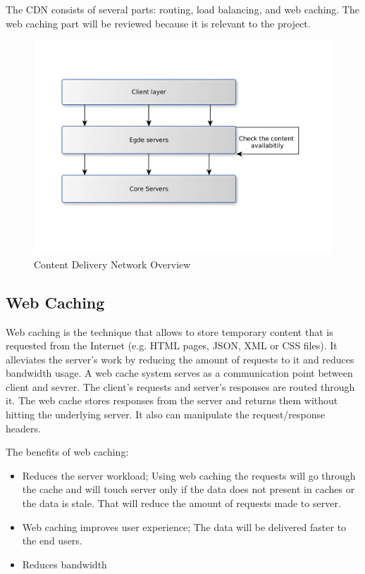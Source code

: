 The CDN consists of several parts: routing, load balancing, and web caching\cite{CDNOverview}. The web caching part will be reviewed because it is relevant to the project.

\begin{figure}[h]
    \centering
    \includegraphics[width=\textwidth]{images/cdn_arch.png}
    \caption{Content Delivery Network Overview}
    \label{fig:cdn_overview}
\end{figure}

\subsection{Web Caching}

Web caching is the technique that allows to store temporary content that is requested from the Internet (e.g. HTML pages, JSON, XML or CSS files). It alleviates the server's work by reducing the amount of requests to it and reduces bandwidth usage\cite{WebCachingInterior}. A web cache system serves as a communication point between client and sevrer. The client's requests and server's responses are routed through it. The web cache stores responses from the server and returns them without hitting the underlying server. It also can manipulate the request/response headers.

The benefits of web caching:

\begin{itemize}
    \item Reduces the server workload; Using web caching the requests will go through the cache and will touch server only if the data does not present in caches or the data is stale. That will reduce the amount of requests made to server.
    \item Web caching improves user experience; The data will be delivered faster to the end users.
    \item Reduces bandwidth
\end{itemize}

